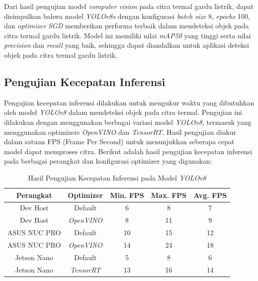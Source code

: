 Dari hasil pengujian model \emph{computer vision} pada citra termal gardu listrik, dapat disimpulkan bahwa model \emph{YOLOv8s} dengan konfigurasi \emph{batch size} 8, \emph{epochs} 100, dan \emph{optimizer} \emph{SGD} memberikan performa terbaik dalam mendeteksi objek pada citra termal gardu listrik. Model ini memiliki nilai \emph{mAP50} yang tinggi serta nilai \emph{precision} dan \emph{recall} yang baik, sehingga dapat diandalkan untuk aplikasi deteksi objek pada citra termal gardu listrik.

\subsection{Pengujian Kecepatan Inferensi}
Pengujian kecepatan inferensi dilakukan untuk mengukur waktu yang dibutuhkan oleh model \emph{YOLOv8} dalam mendeteksi objek pada citra termal. Pengujian ini dilakukan dengan menggunakan berbagai variasi model \emph{YOLOv8}, termasuk yang menggunakan optimizers \emph{OpenVINO} dan \emph{TensorRT}. Hasil pengujian diukur dalam satuan FPS (Frame Per Second) untuk menunjukkan seberapa cepat model dapat memproses citra. Berikut adalah hasil pengujian kecepatan inferensi pada berbagai perangkat dan konfigurasi optimizer yang digunakan:

\begin{table}[H]
\centering
\caption{Hasil Pengujian Kecepatan Inferensi pada Model \emph{YOLOv8}}
\label{tab:kecepatan_inferensi}
\begin{tabular}{|c|c|c|c|c|}
\hline
\textbf{Perangkat}           & \textbf{Optimizer}   & \textbf{Min. FPS} & \textbf{Max. FPS} & \textbf{Avg. FPS} \\ \hline
Dev Host                    & Default              & 6                    & 8                      & 7                      \\
Dev Host                    & \emph{OpenVINO}      & 8                    & 11                     & 9                      \\
ASUS NUC PRO                & Default              & 10                   & 15                     & 12                     \\
ASUS NUC PRO                   & \emph{OpenVINO}      & 14                   & 24                     & 18                     \\
Jetson Nano                 & Default              & 5                    & 8                      & 6                      \\
Jetson Nano                 & \emph{TensorRT}      & 13                   & 16                     & 14                     \\
\hline
\end{tabular}
\end{table}


